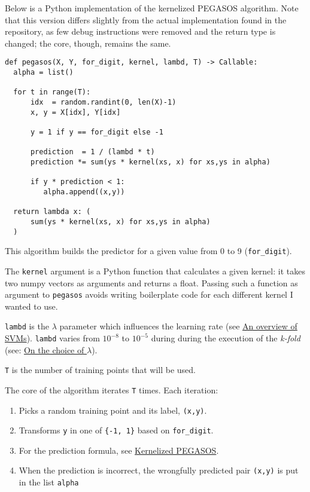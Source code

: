 \documentclass[a4paper]{article}
\begin{document}
Below is a Python implementation of the kernelized PEGASOS algorithm. Note that this version differs slightly from the actual implementation found in the repository, as few debug instructions were removed and the return type is changed; the core, though, remains the same.

\lstset{language=Python,label= ,caption= ,captionpos=b,numbers=none}
\begin{lstlisting}
def pegasos(X, Y, for_digit, kernel, lambd, T) -> Callable:
  alpha = list()

  for t in range(T):
      idx  = random.randint(0, len(X)-1)
      x, y = X[idx], Y[idx]

      y = 1 if y == for_digit else -1

      prediction  = 1 / (lambd * t)
      prediction *= sum(ys * kernel(xs, x) for xs,ys in alpha)

      if y * prediction < 1:
	     alpha.append((x,y))

  return lambda x: (
      sum(ys * kernel(xs, x) for xs,ys in alpha)
  )
\end{lstlisting}

This algorithm builds the predictor for a given value from 0 to 9 (\texttt{for\_digit}).

The \texttt{kernel} argument is a Python function that calculates a given kernel: it takes two numpy vectors as arguments and returns a float. Passing such a function as argument to \texttt{pegasos} avoids writing boilerplate code for each different kernel I wanted to use.

\texttt{lambd} is the \(\lambda\) parameter which influences the learning rate (see \hyperref[org0c7ac3f]{An overview of SVMs}). \texttt{lambd} varies from \(10^{-8}\) to \(10^{-5}\) during during the execution of the \emph{k-fold} (see: \hyperref[org9c98173]{On the choice of \(\lambda\)}).

\texttt{T} is the number of training points that will be used.

The core of the algorithm iterates \texttt{T} times. Each iteration:

\begin{enumerate}
\item Picks a random training point and its label, \texttt{(x,y)}.
\item Transforms \texttt{y} in one of \texttt{\{-1, 1\}} based on \texttt{for\_digit}.
\item For the prediction formula, see \hyperref[orgdedb175]{Kernelized PEGASOS}.
\item When the prediction is incorrect, the wrongfully predicted pair \texttt{(x,y)} is put in the list \texttt{alpha}
\end{enumerate}
\end{document}
